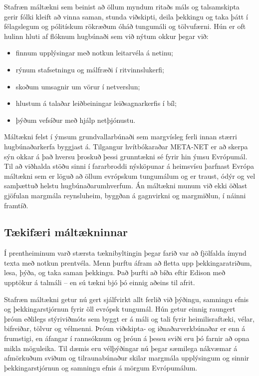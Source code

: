\begin{multicols}{2}
Stafræn máltækni sem beinist að öllum myndum ritaðs máls og talsamskipta gerir fólki kleift að vinna saman, stunda viðskipti, deila þekkingu og taka þátt í félagslegum og pólitískum rökræðum óháð tungumáli og tölvufærni. Hún er oft hulinn hluti af flóknum hugbúnaði sem við nýtum okkur þegar við:

\begin{itemize}
\item finnum upplýsingar með notkun leitarvéla á netinu;
\item rýnum stafsetningu og málfræði í ritvinnslukerfi;
\item skoðum umsagnir um vörur í netverslun;
\item hlustum á talaðar leiðbeiningar leiðsagnarkerfis í bíl;
\item þýðum vefsíður með hjálp netþjónustu.
\end{itemize}

Máltækni felst í ýmsum grundvallarbúnaði sem margvísleg ferli innan stærri hugbúnaðarkerfa byggjast á. Tilgangur hvítbókaraðar META-NET er að skerpa sýn okkar á það hversu þroskuð þessi grunntækni sé fyrir hin ýmsu Evrópumál. 
Til að viðhalda stöðu sinni í fararbroddi nýsköpunar á heimsvísu þarfnast Evrópa máltækni sem er löguð að öllum evrópskum tungumálum og er traust, ódýr og vel samþættuð helstu hugbúnaðarumhverfum. Án máltækni munum við ekki öðlast gjöfulan margmála reynsluheim, byggðan á gagnvirkni og margmiðlun, í náinni framtíð. 

\subsection{Tækifæri máltækninnar}

Í prentheiminum varð stærsta tæknibyltingin þegar farið var að fjölfalda ímynd texta með notkun prentvéla. Menn þurftu áfram að fletta upp þekkingaratriðum, lesa, þýða, og taka saman þekkingu. Það þurfti að bíða eftir Edison með upptökur á talmáli -- en sú tækni bjó þó einnig aðeins til afrit.

Stafræn máltækni getur nú gert sjálfvirkt allt ferlið við þýðingu, samningu efnis og þekkingarstjórnun fyrir öll evrópsk tungumál. Hún getur einnig raungert þróun eðlilegs stýriviðmóts sem byggt er á máli og tali fyrir heimilisraftæki, vélar, bifreiðar, tölvur og vélmenni. Þróun viðskipta- og iðnaðarverkbúnaðar er enn á frumstigi, en áfangar í rannsóknum og þróun á þessu sviði eru þó farnir að opna mikla möguleika. Til dæmis eru vélþýðingar nú þegar sæmilega nákvæmar á afmörkuðum sviðum og tilraunabúnaður skilar margmála upplýsingum og sinnir þekkingarstjórnun og samningu efnis á mörgum Evrópumálum.


\end{multicols}

